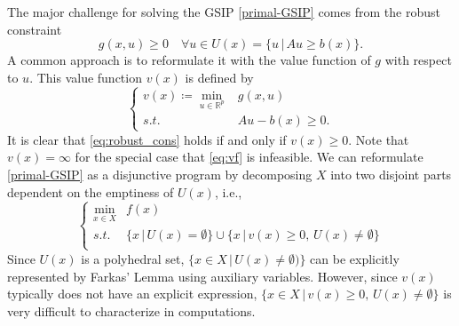 \documentclass{amsart}
\theoremstyle{plain}
\newcommand{\re}{\mathbb{R}}
\newcommand{\st}{\mathit{s.t.}}
\numberwithin{equation}{section}
\begin{document}
	
	The major challenge for solving the GSIP \eqref{primal-GSIP} 
	comes from the robust constraint 
	\begin{equation}\label{eq:robust_cons}
		g(x,u)\ge 0\quad \forall u\in U(x) = \{u\,\vert\, Au\ge b(x)\}.
	\end{equation}
    A common approach is to reformulate it with the value function of $g$ 
    with respect to $u$. This value function $v(x)$ is defined by
	\begin{equation}\label{eq:vf}
		\left\{\begin{array}{rl}
			v(x)\coloneqq \min\limits_{u\in\re^p} & g(x,u)\\
			\st & Au-b(x)\ge 0.
		\end{array}\right.
	\end{equation}
        It is clear that \eqref{eq:robust_cons} holds if and only if $v(x)\ge 0$.
	Note that $v(x)=\infty$ for the special case that \eqref{eq:vf} is infeasible.
	We can reformulate \eqref{primal-GSIP} as a disjunctive program
	by decomposing $X$ into two disjoint parts dependent on the emptiness of $U(x)$, i.e.,
	\begin{equation}\label{eq:vfreform}
		\left\{\begin{array}{cl}
			\min\limits_{x\in X} & f(x)\\
			\st & \{x\,\vert\, U(x)=\emptyset\}\cup 
			\{x\,\vert\, v(x)\ge 0,\, U(x)\neq\emptyset\}\\
		\end{array}
		\right.
	\end{equation}
	Since $U(x)$ is a polyhedral set,  
	$\{x\in X\,\vert\,  U(x)\not=\emptyset)\}$ 
	can be explicitly represented by Farkas' Lemma \cite{Ziegler} using auxiliary variables. 
    However, since $v(x)$ typically does not have an explicit expression, 
    $\{x\in X\,\vert\, v(x)\ge 0,\, U(x)\not=\emptyset\}$
    is very difficult to characterize in computations.
        
\end{document}

